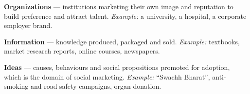 \begin{qlist}
\begin{apts}
\item \textbf{Organizations} --- institutions marketing their own image and
      reputation to build preference and attract talent. \emph{Example:} a
      university, a hospital, a corporate employer brand.
\item \textbf{Information} --- knowledge produced, packaged and sold.
      \emph{Example:} textbooks, market research reports, online courses,
      newspapers.
\item \textbf{Ideas} --- causes, behaviours and social propositions promoted for
      adoption, which is the domain of social marketing. \emph{Example:} ``Swachh
      Bharat'', anti-smoking and road-safety campaigns, organ donation.
\end{apts}


\end{qlist}
